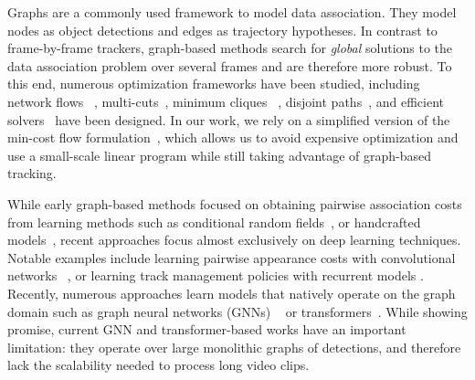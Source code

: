 \documentclass[10pt,twocolumn,letterpaper]{article}
\begin{document}
{{ Graphs are a commonly used framework to model data association. They model nodes as object detections and edges as trajectory hypotheses. In contrast to frame-by-frame trackers, graph-based methods search for \textit{global} solutions to the data association problem over several frames and are therefore more robust.
To this end, numerous optimization frameworks have been studied, including network flows ~\cite{berclaz2011multiple, network_flows_tracking},  multi-cuts~\cite{Tang_2017_CVPR}, minimum cliques ~\cite{zamir2012gmcp}, disjoint paths~\cite{subgraph, lift, aplift}, and efficient solvers~\cite{berclaz2011multiple, Butt2013} have been designed. In our work, we rely on a simplified version of the min-cost flow formulation~\cite{network_flows_tracking, mpntrack}, which allows us to avoid expensive optimization and use a small-scale linear program while still taking  advantage of graph-based tracking. 

 While early graph-based methods focused on obtaining pairwise association costs from learning methods such as conditional random fields~\cite{crf_learned}, or handcrafted models~\cite{color_tracking}, recent approaches focus almost exclusively on deep learning techniques. Notable examples include learning pairwise appearance costs with convolutional networks ~\cite{Leal-Taixe_2016_CVPR_Workshops, Son_2017_CVPR, Ristani_2018_CVPR}, or learning track management policies with recurrent models \cite{Sadeghian_2017_ICCV, tracking_rnn}. Recently, numerous approaches learn models that natively operate on the graph domain such as graph neural networks (GNNs) ~\cite{mpntrack, lpc, gmt, graph_nets_mot, gnn_3dmot, gsm, braso2022multi} or transformers~\cite{zhou2022global}. While showing promise, current  GNN and transformer-based  works have an important limitation: they operate over large monolithic graphs of detections, and therefore lack the scalability needed to process long video clips.









}}
\end{document}
